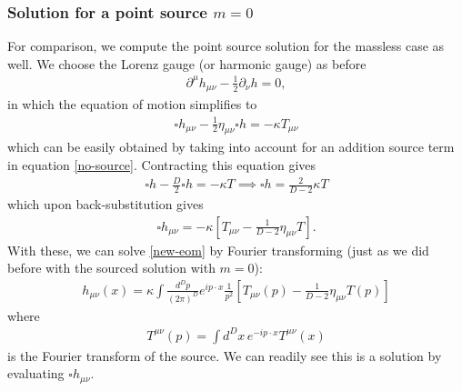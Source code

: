 \documentclass{book}
\theoremstyle{definition}
\newcommand{\p}{\partial}
\newcommand{\f}[2]{\frac{#1}{#2}}
\newcommand{\lb}{\left[}
\newcommand{\rb}{\right]}
\begin{document}
\subsubsection{Solution for a point source $m = 0$}
For comparison, we compute the point source solution for the massless case as well. We choose the Lorenz gauge (or harmonic gauge) as before
\begin{align}
\p^\mu h_{\mu\nu} - \f{1}{2}\p_\nu h = 0,
\end{align} 
in which the equation of motion simplifies to 
\begin{align}\label{new-eom}
\square h_{\mu\nu} - \f{1}{2}\eta_{\mu\nu}\square h = -\kappa T_{\mu\nu}
\end{align}
which can be easily obtained by taking into account for an addition source term in equation \eqref{no-source}. Contracting this equation gives
\begin{align}
\square h - \f{D}{2}\square h = -\kappa T\implies \square h = \f{2}{D-2}\kappa T
\end{align}
which upon back-substitution gives
\begin{align}
\square h_{\mu\nu} = -\kappa \lb T_{\mu\nu} - \f{1}{D-2}\eta_{\mu\nu}T \rb.
\end{align}
With these, we can solve \eqref{new-eom} by Fourier transforming (just as we did before with the sourced solution with $m=0$):
\begin{align}\label{new-soln}
\boxed{h_{\mu\nu}(x) = \kappa \int \f{d^Dp}{(2\pi)^D} e^{ip\cdot x}\f{1}{p^2}\lb T_{\mu\nu}(p) - \f{1}{D-2}\eta_{\mu\nu}T(p) \rb}
\end{align}         
where
\begin{align}
T^{\mu\nu}(p) = \int d^Dx\, e^{-ip\cdot x}T^{\mu\nu}(x) 
\end{align}
is the Fourier transform of the source. We can readily see this is a solution by evaluating $\square h_{\mu\nu}$. \\
\end{document}
